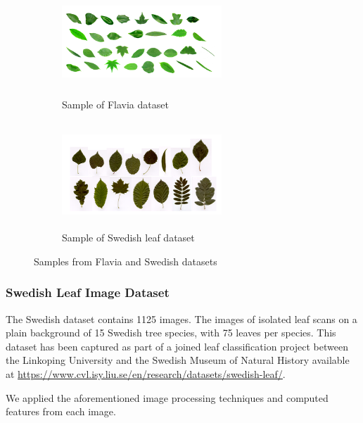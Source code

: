 \documentclass{article}
\begin{document}
\begin{figure}[!ht]
\begin{subfigure}{.5\textwidth}
\centering
        \includegraphics[width=60mm, height=40mm]{Figures/flavia_images.png}
        \caption{\label{slp1}Sample of Flavia dataset}
        
\end{subfigure} 
\begin{subfigure}{.5\textwidth}
\centering
        \includegraphics[width=60mm, height=40mm]{leaffeatures/swedish_data.png}
        \caption{\label{slp2}Sample of Swedish leaf dataset}
        
\end{subfigure} 

\caption{Samples from Flavia and Swedish datasets}
        \end{figure}

\hypertarget{swedish-leaf-image-dataset}{%
\subsubsection{Swedish Leaf Image
Dataset}\label{swedish-leaf-image-dataset}}

The Swedish dataset contains 1125 images. The images of isolated
leaf scans on a plain background of 15 Swedish tree species, with 75
leaves per species. This dataset has been captured as part of a joined
leaf classification project between the Linkoping University and the
Swedish Museum of Natural History \citep{articlee} available at
\url{https://www.cvl.isy.liu.se/en/research/datasets/swedish-leaf/}.


We applied the aforementioned image processing techniques and computed
features from each image. 
\end{document}
